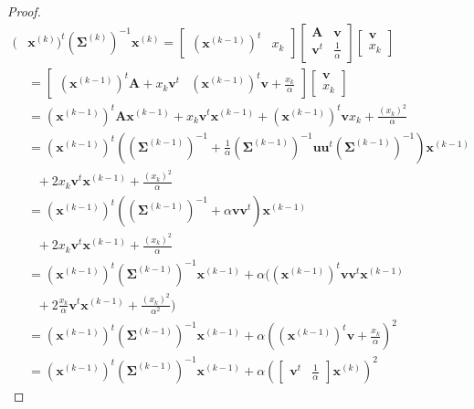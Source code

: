 \documentclass[journal,peerreview,onecolumn]{IEEEtran}
\begin{document}
        \begin{proof}
            \begin{align*}
                (&\mathbf{x}^{(k)})^t (\boldsymbol{\Sigma}^{(k)})^{-1} \mathbf{x}^{(k)}
                = \left[\begin{array}{cc} (\mathbf{x}^{(k-1)})^t   & x_k \end{array}\right]
                \left[\begin{array}{cc}
                \mathbf{A}   & \mathbf{v} \\
                \mathbf{v}^t & \frac{1}{\alpha}
                \end{array}\right]
                \left[\begin{array}{c} \mathbf{v} \\ x_k \end{array}\right] \\
                &= \left[\begin{array}{cc} (\mathbf{x}^{(k-1)})^t \mathbf{A} + x_k \mathbf{v}^t & (\mathbf{x}^{(k-1)})^t \mathbf{v} + \frac{x_k}{\alpha} \end{array}\right]
                \left[\begin{array}{c} \mathbf{v} \\ x_k \end{array}\right] \\
                &= (\mathbf{x}^{(k-1)})^t \mathbf{A} \mathbf{x}^{(k-1)} + x_k \mathbf{v}^t \mathbf{x}^{(k-1)} + (\mathbf{x}^{(k-1)})^t \mathbf{v} x_k + \frac{(x_k)^2}{\alpha} \\
                &= (\mathbf{x}^{(k-1)})^t ((\boldsymbol{\Sigma}^{(k-1)})^{-1} + \frac{1}{\alpha} (\boldsymbol{\Sigma}^{(k-1)})^{-1} \mathbf{u} \mathbf{u}^t (\boldsymbol{\Sigma}^{(k-1)})^{-1}) \mathbf{x}^{(k-1)}\\
                &~~~+ 2 x_k \mathbf{v}^t \mathbf{x}^{(k-1)} + \frac{(x_k)^2}{\alpha} \\
                &= (\mathbf{x}^{(k-1)})^t ((\boldsymbol{\Sigma}^{(k-1)})^{-1} + \alpha \mathbf{v} \mathbf{v}^t) \mathbf{x}^{(k-1)}\\
                &~~~+ 2 x_k \mathbf{v}^t \mathbf{x}^{(k-1)} + \frac{(x_k)^2}{\alpha} \\
                &= (\mathbf{x}^{(k-1)})^t (\boldsymbol{\Sigma}^{(k-1)})^{-1} \mathbf{x}^{(k-1)} + \alpha ( (\mathbf{x}^{(k-1)})^t \mathbf{v} \mathbf{v}^t \mathbf{x}^{(k-1)} \\
                &~~~+ 2 \frac{x_k}{\alpha} \mathbf{v}^t \mathbf{x}^{(k-1)} + \frac{(x_k)^2}{\alpha^2}) \\
                &= (\mathbf{x}^{(k-1)})^t (\boldsymbol{\Sigma}^{(k-1)})^{-1} \mathbf{x}^{(k-1)} + \alpha ( (\mathbf{x}^{(k-1)})^t \mathbf{v} + \frac{x_k}{\alpha} )^2 \\
                &= (\mathbf{x}^{(k-1)})^t (\boldsymbol{\Sigma}^{(k-1)})^{-1} \mathbf{x}^{(k-1)} + \alpha ( \left[\begin{array}{cc} \mathbf{v}^t & \frac{1}{\alpha} \end{array}\right] \mathbf{x}^{(k)} )^2
            \end{align*}
        \end{proof}
\end{document}
